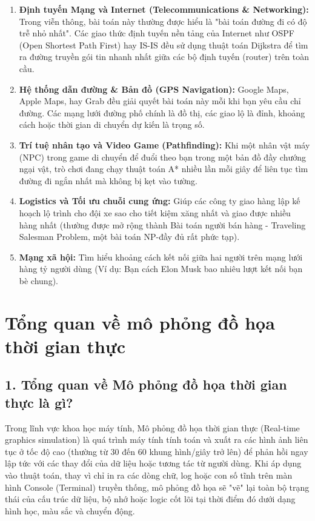\documentclass[12pt,a4paper,oneside]{report}
\begin{document}
\begin{enumerate}
    \item \textbf{Định tuyến Mạng và Internet (Telecommunications \& Networking):} Trong viễn thông, bài toán này thường được hiểu là "bài toán đường đi có độ trễ nhỏ nhất". Các giao thức định tuyến nền tảng của Internet như OSPF (Open Shortest Path First) hay IS-IS đều sử dụng thuật toán Dijkstra để tìm ra đường truyền gói tin nhanh nhất giữa các bộ định tuyến (router) trên toàn cầu.
    \item \textbf{Hệ thống dẫn đường \& Bản đồ (GPS Navigation):} Google Maps, Apple Maps, hay Grab đều giải quyết bài toán này mỗi khi bạn yêu cầu chỉ đường. Các mạng lưới đường phố chính là đồ thị, các giao lộ là đỉnh, khoảng cách hoặc thời gian di chuyển dự kiến là trọng số.
    \item \textbf{Trí tuệ nhân tạo và Video Game (Pathfinding):} Khi một nhân vật máy (NPC) trong game di chuyển để đuổi theo bạn trong một bản đồ đầy chướng ngại vật, trò chơi đang chạy thuật toán A* nhiều lần mỗi giây để liên tục tìm đường đi ngắn nhất mà không bị kẹt vào tường.
    \item \textbf{Logistics và Tối ưu chuỗi cung ứng:} Giúp các công ty giao hàng lập kế hoạch lộ trình cho đội xe sao cho tiết kiệm xăng nhất và giao được nhiều hàng nhất (thường được mở rộng thành Bài toán người bán hàng - Traveling Salesman Problem, một bài toán NP-đầy đủ rất phức tạp).
    \item \textbf{Mạng xã hội:} Tìm hiểu khoảng cách kết nối giữa hai người trên mạng lưới hàng tỷ người dùng (Ví dụ: Bạn cách Elon Musk bao nhiêu lượt kết nối bạn bè chung).
\end{enumerate}
\section{Tổng quan về mô phỏng đồ họa thời gian thực}
\subsection*{1. Tổng quan về Mô phỏng đồ họa thời gian thực là gì?}
Trong lĩnh vực khoa học máy tính, Mô phỏng đồ họa thời gian thực (Real-time graphics simulation) là quá trình máy tính tính toán và xuất ra các hình ảnh liên tục ở tốc độ cao (thường từ 30 đến 60 khung hình/giây trở lên) để phản hồi ngay lập tức với các thay đổi của dữ liệu hoặc tương tác từ người dùng. Khi áp dụng vào thuật toán, thay vì chỉ in ra các dòng chữ, log hoặc con số tĩnh trên màn hình Console (Terminal) truyền thống, mô phỏng đồ họa sẽ "vẽ" lại toàn bộ trạng thái của cấu trúc dữ liệu, bộ nhớ hoặc logic cốt lõi tại thời điểm đó dưới dạng hình học, màu sắc và chuyển động.
\end{document}
